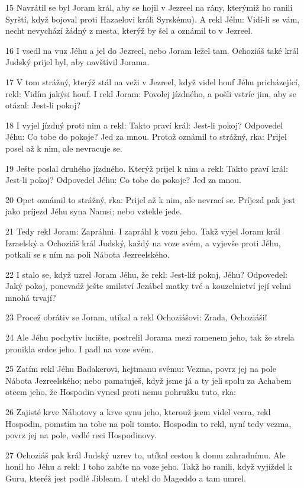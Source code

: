 \par 15 Navrátil se byl Joram král, aby se hojil v Jezreel na rány, kterýmiž ho ranili Syrští, když bojoval proti Hazaelovi králi Syrskému). A rekl Jéhu: Vidí-li se vám, necht nevychází žádný z mesta, kterýž by šel a oznámil to v Jezreel.
\par 16 I vsedl na vuz Jéhu a jel do Jezreel, nebo Joram ležel tam. Ochoziáš také král Judský prijel byl, aby navštívil Jorama.
\par 17 V tom strážný, kterýž stál na veži v Jezreel, když videl houf Jéhu pricházející, rekl: Vidím jakýsi houf. I rekl Joram: Povolej jízdného, a pošli vstríc jim, aby se otázal: Jest-li pokoj?
\par 18 I vyjel jízdný proti nim a rekl: Takto praví král: Jest-li pokoj? Odpovedel Jéhu: Co tobe do pokoje? Jed za mnou. Protož oznámil to strážný, rka: Prijel posel až k nim, ale nevracuje se.
\par 19 Ješte poslal druhého jízdného. Kterýž prijel k nim a rekl: Takto praví král: Jest-li pokoj? Odpovedel Jéhu: Co tobe do pokoje? Jed za mnou.
\par 20 Opet oznámil to strážný, rka: Prijel až k nim, ale nevrací se. Príjezd pak jest jako príjezd Jéhu syna Namsi; nebo vztekle jede.
\par 21 Tedy rekl Joram: Zapráhni. I zapráhl k vozu jeho. Takž vyjel Joram král Izraelský a Ochoziáš král Judský, každý na voze svém, a vyjevše proti Jéhu, potkali se s ním na poli Nábota Jezreelského.
\par 22 I stalo se, když uzrel Joram Jéhu, že rekl: Jest-liž pokoj, Jéhu? Odpovedel: Jaký pokoj, ponevadž ješte smilství Jezábel matky tvé a kouzelnictví její velmi mnohá trvají?
\par 23 Procež obrátiv se Joram, utíkal a rekl Ochoziášovi: Zrada, Ochoziáši!
\par 24 Ale Jéhu pochytiv lucište, postrelil Jorama mezi ramenem jeho, tak že strela pronikla srdce jeho. I padl na voze svém.
\par 25 Zatím rekl Jéhu Badakerovi, hejtmanu svému: Vezma, povrz jej na pole Nábota Jezreelského; nebo pamatuješ, když jsme já a ty jeli spolu za Achabem otcem jeho, že Hospodin vynesl proti nemu pohružku tuto, rka:
\par 26 Zajisté krve Nábotovy a krve synu jeho, kterouž jsem videl vcera, rekl Hospodin, pomstím na tobe na poli tomto. Hospodin to rekl, nyní tedy vezma, povrz jej na pole, vedlé reci Hospodinovy.
\par 27 Ochoziáš pak král Judský uzrev to, utíkal cestou k domu zahradnímu. Ale honil ho Jéhu a rekl: I toho zabíte na voze jeho. Takž ho ranili, když vyjíždel k Guru, kteréž jest podlé Jibleam. I utekl do Mageddo a tam umrel.
